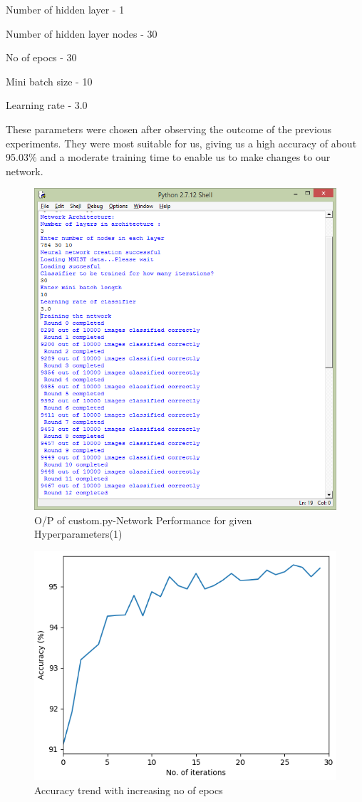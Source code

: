 \documentclass[conference]{IEEEtran}
\begin{document}
Number of hidden layer - 1

Number of hidden layer nodes - 30

No of epocs - 30

Mini batch size - 10

Learning rate - 3.0

These parameters were chosen after observing the outcome of the previous experiments. They were most suitable for us, giving us a high accuracy of about 95.03\% and a moderate training time to enable us to make changes to our network. 


\begin{figure}[h]
	\centering
	\includegraphics[width=\linewidth]{custom}
	\caption{O/P of custom.py-Network Performance for given Hyperparameters(1)}
\end{figure}
\begin{figure}[h]
	\centering
	\includegraphics[width=\linewidth]{Custom_Accuracy}
	\caption{Accuracy trend with increasing no of epocs}
\end{figure}
\end{document}
